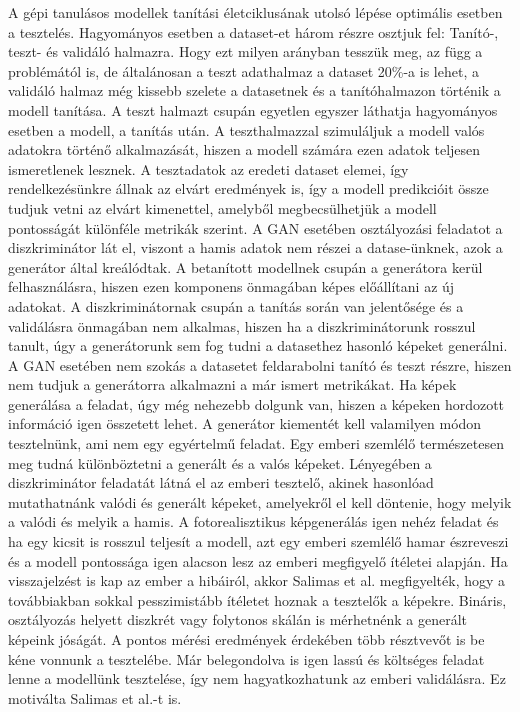 A gépi tanulásos modellek tanítási életciklusának utolsó lépése optimális esetben a tesztelés. Hagyományos esetben a dataset-et három részre osztjuk fel: Tanító-, teszt- és validáló halmazra. Hogy ezt milyen arányban tesszük meg, az függ a problémától is, de általánosan a teszt adathalmaz a dataset 20\%-a is lehet, a validáló halmaz még kissebb szelete a datasetnek és a tanítóhalmazon történik a modell tanítása.
A teszt halmazt csupán egyetlen egyszer láthatja hagyományos esetben a modell, a tanítás után.
A teszthalmazzal szimuláljuk a modell valós adatokra történő alkalmazását, hiszen a modell számára ezen adatok teljesen ismeretlenek lesznek. A tesztadatok az eredeti dataset elemei, így rendelkezésünkre állnak az elvárt eredmények is, így a modell predikcióit össze tudjuk vetni az elvárt kimenettel, amelyből megbecsülhetjük a modell pontosságát különféle metrikák szerint.
A GAN esetében osztályozási feladatot a diszkriminátor lát el, viszont a hamis adatok nem részei a datase-ünknek, azok a generátor által kreálódtak. A betanított modellnek csupán a generátora kerül felhasználásra, hiszen ezen komponens önmagában képes előállítani az új adatokat. A diszkriminátornak csupán a tanítás során van jelentősége és a validálásra önmagában nem alkalmas, hiszen ha a diszkriminátorunk rosszul tanult, úgy a generátorunk sem fog tudni a datasethez hasonló képeket generálni.
A GAN esetében nem szokás a datasetet feldarabolni tanító és teszt részre, hiszen nem tudjuk a generátorra alkalmazni a már ismert metrikákat.
Ha képek generálása a feladat, úgy még nehezebb dolgunk van, hiszen a képeken hordozott információ igen összetett lehet.
A generátor kiementét kell valamilyen módon tesztelnünk, ami nem egy egyértelmű feladat.
Egy emberi szemlélő természetesen meg tudná különböztetni a generált és a valós képeket. Lényegében a diszkriminátor feladatát látná el az emberi tesztelő, akinek hasonlóad mutathatnánk valódi és generált képeket, amelyekről el kell döntenie, hogy melyik a valódi és melyik a hamis. A fotorealisztikus képgenerálás igen nehéz feladat és ha egy kicsit is rosszul teljesít a modell, azt egy emberi szemlélő hamar észreveszi és a modell pontossága igen alacson lesz az emberi megfigyelő ítéletei alapján. Ha visszajelzést is kap az ember a hibáiról, akkor Salimas et al. megfigyelték, hogy a továbbiakban sokkal pesszimistább ítéletet hoznak a tesztelők a képekre. Bináris, osztályozás helyett diszkrét vagy folytonos skálán is mérhetnénk a generált képeink jóságát. A pontos mérési eredmények érdekében több résztvevőt is be kéne vonnunk a tesztelébe. Már belegondolva is igen lassú és költséges feladat lenne a modellünk tesztelése, így nem hagyatkozhatunk az emberi validálásra. Ez motiválta Salimas et al.-t is.


